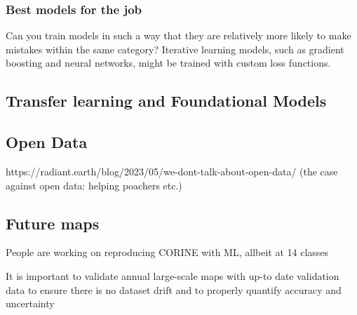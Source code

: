         \subsubsection{Best models for the job}
                Can you train models in such a way that they are relatively more likely to make mistakes within the same category? Iterative learning models, such as gradient boosting and neural networks, might be trained with custom loss functions.

    \subsection{Transfer learning and Foundational Models}
    
    
    
    \subsection{Open Data}
    https://radiant.earth/blog/2023/05/we-dont-talk-about-open-data/ (the case against open data: helping poachers etc.)
    \subsection{Future maps}
    
        People are working on reproducing CORINE with ML, allbeit at 14 classes \citep{bhugra2022rapidai4eo}
        
        It is important to validate annual large-scale maps with up-to date validation data to ensure there is no dataset drift and to properly quantify accuracy and uncertainty \citep{tsendbazar2021towards}
    
    
            
                
            



        


